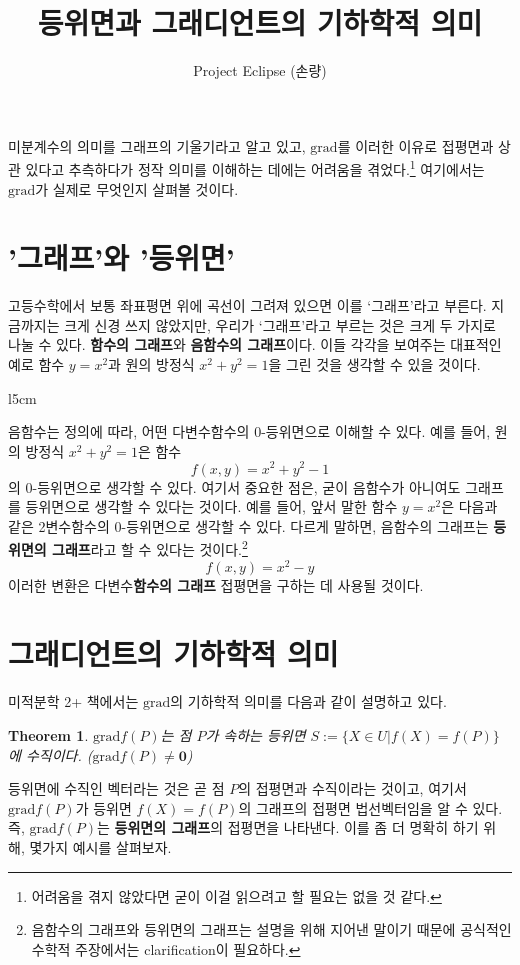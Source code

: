 \documentclass{scrartcl}
\title{등위면과 그래디언트의 기하학적 의미}
\author{Project Eclipse (손량)}
\date{}
\newtheorem{theorem}{Theorem}
\newcommand{\grad}{\text{grad}}
\begin{document}
\maketitle

미분계수의 의미를 그래프의 기울기라고 알고 있고, \(\grad\)를 이러한 이유로 접평면과 상관 있다고 추측하다가 정작 의미를 이해하는 데에는 어려움을 겪었다.\footnote{어려움을 겪지 않았다면 굳이 이걸 읽으려고 할 필요는 없을 것 같다.} 여기에서는 \(\grad\)가 실제로 무엇인지 살펴볼 것이다.

\section{'그래프'와 '등위면'}
고등수학에서 보통 좌표평면 위에 곡선이 그려져 있으면 이를 `그래프'라고 부른다. 지금까지는 크게 신경 쓰지 않았지만, 우리가 `그래프'라고 부르는 것은 크게 두 가지로 나눌 수 있다. \textbf{함수의 그래프}와 \textbf{음함수의 그래프}이다. 이들 각각을 보여주는 대표적인 예로 함수 \(y=x^2\)과 원의 방정식 \(x^2+y^2=1\)을 그린 것을 생각할 수 있을 것이다.
\begin{wrapfigure}[13]{l}{5cm}
  \centering
  
\end{wrapfigure}
음함수는 정의에 따라, 어떤 다변수함수의 0-등위면으로 이해할 수 있다. 예를 들어, 원의 방정식 \(x^2+y^2=1\)은 함수
\[f(x,y)=x^2+y^2-1\]
의 0-등위면으로 생각할 수 있다. 여기서 중요한 점은, 굳이 음함수가 아니여도 그래프를 등위면으로 생각할 수 있다는 것이다. 예를 들어, 앞서 말한 함수 \(y=x^2\)은 다음과 같은 2변수함수의 0-등위면으로 생각할 수 있다. 다르게 말하면, 음함수의 그래프는 \textbf{등위면의 그래프}라고 할 수 있다는 것이다.\footnote{음함수의 그래프와 등위면의 그래프는 설명을 위해 지어낸 말이기 때문에 공식적인 수학적 주장에서는 clarification이 필요하다.}
\[f(x,y)=x^2-y\]
이러한 변환은 다변수\textbf{함수의 그래프} 접평면을 구하는 데 사용될 것이다.

\section{그래디언트의 기하학적 의미}
미적분학 2+ 책에서는 \(\grad\)의 기하학적 의미를 다음과 같이 설명하고 있다.
\begin{theorem}
\(\grad f(P)\)는 점 \(P\)가 속하는 등위면 \(S:=\{X\in U|f(X)=f(P)\}\)에 수직이다. (\(\grad f(P)\neq\mathbf{0}\))
\end{theorem}
등위면에 수직인 벡터라는 것은 곧 점 \(P\)의 접평면과 수직이라는 것이고, 여기서 \(\grad f(P)\)가 등위면 \(f(X)=f(P)\)의 그래프의 접평면 법선벡터임을 알 수 있다. 즉, \(\grad f(P)\)는 \textbf{등위면의 그래프}의 접평면을 나타낸다. 이를 좀 더 명확히 하기 위해, 몇가지 예시를 살펴보자.
\end{document}
